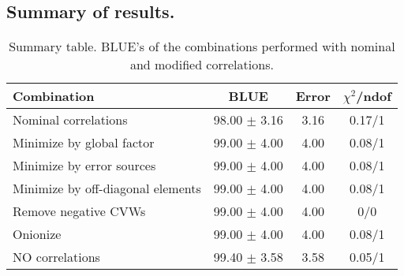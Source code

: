 \subsection{Summary of results.}
\begin{table}[h]
\scriptsize
\begin{center}
\renewcommand{\arraystretch}{1.1}
\begin{tabular}{|l|c|c|c|}
\hline
Combination & BLUE & {\tiny Error} & {\tiny$\chi^2$/ndof} \\
\hline
Nominal correlations &      98.00 $\pm$      3.16 &       3.16 &       0.17/1\\
\hline
Minimize by global factor &      99.00 $\pm$      4.00 &       4.00 &       0.08/1\\
Minimize by error sources &      99.00 $\pm$      4.00 &       4.00 &       0.08/1\\
Minimize by off-diagonal elements &      99.00 $\pm$      4.00 &       4.00 &       0.08/1\\
Remove negative CVWs &      99.00 $\pm$      4.00 &       4.00 &  0/0\\
Onionize &      99.00 $\pm$      4.00 &       4.00 &       0.08/1\\
\hline
NO correlations &      99.40 $\pm$      3.58 &       3.58 &       0.05/1\\
\hline
\end{tabular}
\renewcommand{\arraystretch}{1}
\caption{Summary table. BLUE's of the combinations performed with nominal and modified correlations.}
\end{center}
\end{table}

\clearpage
